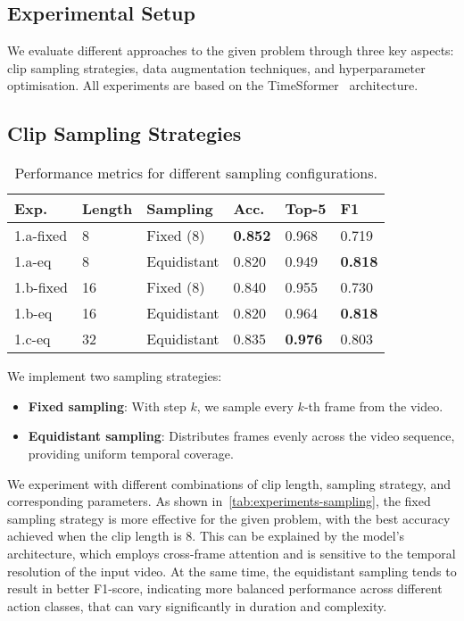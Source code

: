 \subsection{Experimental Setup}

We evaluate different approaches to the given problem through three key aspects: clip sampling strategies, data augmentation techniques, and hyperparameter optimisation.
All experiments are based on the TimeSformer~\cite{TODO} architecture.

\subsection{Clip Sampling Strategies}
\begin{table}[h]
    \centering
    \begin{tabular}{llllll}
    \hline
    \textbf{Exp.} & \textbf{Length} & \textbf{Sampling} & \textbf{Acc.} & \textbf{Top-5} & \textbf{F1} \\
    \hline
    1.a-fixed & 8 & Fixed (8) & \textbf{0.852} & 0.968 & 0.719 \\
    1.a-eq & 8 & Equidistant & 0.820 & 0.949 & \textbf{0.818} \\
    1.b-fixed & 16 & Fixed (8) & 0.840 & 0.955 & 0.730 \\
    1.b-eq & 16 & Equidistant & 0.820 & 0.964 & \textbf{0.818} \\
    1.c-eq & 32 & Equidistant & 0.835 & \textbf{0.976} & 0.803 \\
    \end{tabular}
    \caption{Performance metrics for different sampling configurations.}\label{tab:experiments-sampling}
\end{table}

We implement two sampling strategies:
\begin{itemize}
    \item \textbf{Fixed sampling}: With step $k$, we sample every $k$-th frame from the video.
    
    \item \textbf{Equidistant sampling}: Distributes frames evenly across the video sequence, providing uniform temporal coverage.
\end{itemize}

We experiment with different combinations of clip length, sampling strategy, and corresponding parameters.
As shown in~\autoref{tab:experiments-sampling}, the fixed sampling strategy is more effective for the given problem, with the best accuracy achieved when the clip length is $8$.
This can be explained by the model's architecture, which employs cross-frame attention and is sensitive to the temporal resolution of the input video.
At the same time, the equidistant sampling tends to result in better F1-score, indicating more balanced performance across different action classes, that can vary significantly in duration and complexity.

